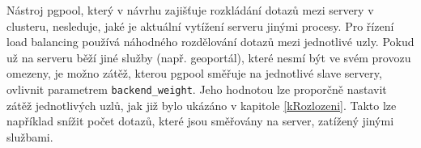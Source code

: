 Nástroj pgpool, který v návrhu zajišťuje rozkládání dotazů mezi servery v
clusteru, nesleduje, jaké je aktuální vytížení serveru jinými procesy. Pro řízení
load ba\-la\-ncing používá náhodného rozdělování dotazů mezi jednotlivé uzly. 
Pokud už na serveru běží jiné služby (např. geoportál), které nesmí být ve svém
provozu omezeny, je možno zátěž, kterou pgpool směřuje na jednotlivé slave
servery, ovlivnit parametrem \texttt{backend\_weight}. Jeho hodnotou lze proporčně
nastavit zátěž jednotlivých uzlů, jak již bylo ukázáno v kapitole
\ref{kRozlozeni}. Takto lze například snížit počet dotazů, které jsou
směřovány na server, zatížený jinými službami.

